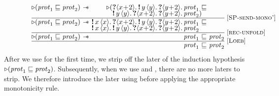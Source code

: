 \[\begin{array}{@{} r @{\ } c @{\ } r @{} l @{\ } l @{} l @{}}
    \later(\subprot {\prot_1} {\prot_2}) & \wand &
    \later (
  \subprot
    {\recvprotT{}{\var\!+\!2}
     \sendprotT{\varB}{\varB}
     \recvprotT{}{\varB\!+\!2}
     \prot_1 &\ }
    {\\[-0.3em] && \sendprotT{\varB}{\varB}
     \recvprotT{}{\var\!+\!2}
     \recvprotT{}{\varB\!+\!2}
     \prot_2}
  &)&& \linetext{\ruleref{SP-send-mono'}} \\ \hline
  \later (\subprot {\prot_1} {\prot_2}) & \wand &
  \subprot
    {\sendprotT{\var}{\var}
     \recvprotT{}{\var\!+\!2}
     \sendprotT{\varB}{\varB}
     \recvprotT{}{\varB\!+\!2}
     \prot_1 &\ }
    {\\[-0.3em] && \sendprotT{\var}{\var}
     \sendprotT{\varB}{\varB}
     \recvprotT{}{\var\!+\!2}
     \recvprotT{}{\varB\!+\!2}
     \prot_2}
  &&& \linetext{\ruleref{rec-unfold}} \\ \hline
  \later (\subprot {\prot_1} {\prot_2}) & \wand &
    \subprot {\prot_1 &\ } {& \prot_2}
  & \linetext{\ruleref{Loeb}} \\ \hline
  && \subprot {\prot_1 &\ } {& \prot_2}
\end{array}
\]
After we use  for the first time, we strip
off the later of the induction hypothesis $\mathop{{\triangleright}} (\mathit{prot}_1 \sqsubseteq \mathit{prot}_2)$.
Subsequently, when we use  and ,
there are no more laters to strip.
We therefore introduce the later using  before applying the
appropriate monotonicity rule.

